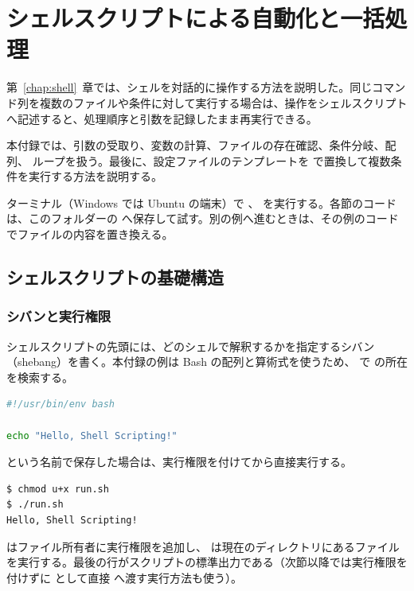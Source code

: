 \chapter{シェルスクリプトによる自動化と\mbox{一括処理}}
\label{app:shell_scripting}

第~\ref{chap:shell}~章では、シェルを対話的に操作する方法を説明した。同じコマンド列を複数のファイルや条件に対して実行する場合は、操作をシェルスクリプトへ記述すると、処理順序と引数を記録したまま再実行できる。

本付録では、引数の受取り、変数の計算、ファイルの存在確認、条件分岐、配列、 ループを扱う。最後に、設定ファイルのテンプレートを  で置換して複数条件を実行する方法を説明する。

ターミナル（Windows では Ubuntu の端末）で 、 を実行する。各節のコードは、このフォルダーの  へ保存して試す。別の例へ進むときは、その例のコードでファイルの内容を置き換える。

\section{シェルスクリプトの基礎構造}

\subsection{シバンと実行権限}

シェルスクリプトの先頭には、どのシェルで解釈するかを指定するシバン（shebang）を書く。本付録の例は Bash の配列と算術式を使うため、 で  の所在を検索する。

\begin{lstlisting}[language=bash]
#!/usr/bin/env bash

echo "Hello, Shell Scripting!"
\end{lstlisting}

 という名前で保存した場合は、実行権限を付けてから直接実行する。

\begin{lstlisting}[numbers=none, xleftmargin=2\zw]
$ chmod u+x run.sh
$ ./run.sh
Hello, Shell Scripting!
\end{lstlisting}

 はファイル所有者に実行権限を追加し、 は現在のディレクトリにあるファイルを実行する。最後の行がスクリプトの標準出力である（次節以降では実行権限を付けずに  として直接  へ渡す実行方法も使う）。

